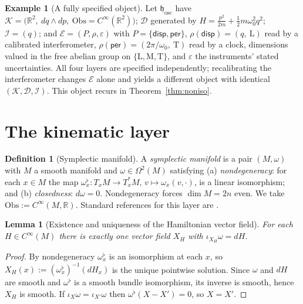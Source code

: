 \documentclass[10pt,a4paper]{article}
\theoremstyle{plain}
\newtheorem{lemma}[theorem]{Lemma}
\theoremstyle{definition}
\newtheorem{definition}[theorem]{Definition}
\newtheorem{example}[theorem]{Example}
\newcommand{\Obs}{\mathrm{Obs}}
\newcommand{\Cinf}{C^{\infty}}
\newcommand{\ins}{\iota}
\newcommand{\R}{\mathbb{R}}
\begin{document}
\begin{example}[A fully specified object]
\label{ex:osc}
Let $\mathfrak{h}_{\mathrm{osc}}$ have $\mathcal{K} = \big(\R^2,\ dq\wedge dp,\ \Obs = \Cinf(\R^2)\big)$; $\mathcal{D}$ generated by $H = \frac{p^2}{2m} + \frac12 m\omega_0^2q^2$; $\mathcal{I} = (q)$; and $\mathcal{E} = (P,\rho,\varepsilon)$ with $P = \{\mathsf{disp},\mathsf{per}\}$, $\rho(\mathsf{disp}) = (q,\ \mathrm{L})$ read by a calibrated interferometer, $\rho(\mathsf{per}) = (2\pi/\omega_0,\ \mathrm{T})$ read by a clock, dimensions valued in the free abelian group on $\{\mathrm{L},\mathrm{M},\mathrm{T}\}$, and $\varepsilon$ the instruments' stated uncertainties. All four layers are specified independently; recalibrating the interferometer changes $\mathcal{E}$ alone and yields a different object with identical $(\mathcal{K},\mathcal{D},\mathcal{I})$. This object recurs in Theorem~\ref{thm:noniso}.
\end{example}

\section{The kinematic layer}
\label{sec:kinematic}

\begin{definition}[Symplectic manifold]
\label{def:symp}
A \emph{symplectic manifold} is a pair $(M,\omega)$ with $M$ a smooth manifold and $\omega \in \Omega^2(M)$ satisfying (a) \emph{nondegeneracy}: for each $x \in M$ the map $\omega^\flat_x: T_xM \to T^*_xM$, $v \mapsto \omega_x(v,\cdot)$, is a linear isomorphism; and (b) \emph{closedness}: $d\omega = 0$. Nondegeneracy forces $\dim M = 2n$ even. We take $\Obs := \Cinf(M,\R)$. Standard references for this layer are \cite{AbrahamMarsden1978,Arnold1989,LibermannMarle1987,McDuffSalamon2017}.
\end{definition}

\begin{lemma}[Existence and uniqueness of the Hamiltonian vector field]
\label{lem:XH}
For each $H \in \Cinf(M)$ there is exactly one vector field $X_H$ with $\ins_{X_H}\omega = dH$.
\end{lemma}
\begin{proof}
By nondegeneracy $\omega^\flat_x$ is an isomorphism at each $x$, so $X_H(x) := (\omega^\flat_x)^{-1}(dH_x)$ is the unique pointwise solution. Since $\omega$ and $dH$ are smooth and $\omega^\flat$ is a smooth bundle isomorphism, its inverse is smooth, hence $X_H$ is smooth. If $\ins_{X}\omega = \ins_{X'}\omega$ then $\omega^\flat(X - X') = 0$, so $X = X'$.
\end{proof}
\end{document}
